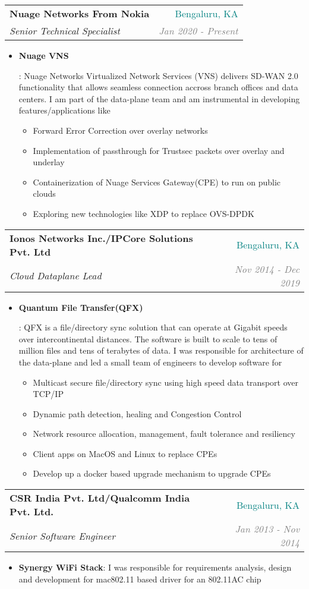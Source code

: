 \documentclass[letterpaper,11pt]{article}
\makeatletter
\newcommand{\resumeItem}[2]{
  \item\small{
    \textbf{#1}{: #2 \vspace{-2pt}}
  }
}
\newcommand{\resumeSubheading}[4]{
  \vspace{-1pt}\item
    \begin{tabular*}{0.97\textwidth}[t]{l@{\extracolsep{\fill}}r}
      \textbf{#1} & #2 \\
      \textit{\small#3} & \textit{\small #4} \\
    \end{tabular*}\vspace{-5pt}
}
\newcommand{\resumeItemListStart}{\begin{itemize}}
\newcommand{\resumeItemListEnd}{\end{itemize}\vspace{-5pt}}
\makeatother
\begin{document}
       \resumeSubheading
      {Nuage Networks From Nokia}{\textcolor{teal}{Bengaluru, KA}}
      {Senior Technical Specialist}{\textcolor{GRAY}{Jan 2020 - Present}}
      \resumeItemListStart
        \resumeItem{Nuage VNS}
          {
           Nuage Networks Virtualized Network Services (VNS) delivers SD-WAN 2.0 functionality that allows seamless connection accross branch offices and data centers. I am part of the data-plane team and am instrumental in developing features/applications like
           \begin{itemize}
           \item {Forward Error Correction over overlay networks}
           \item {Implementation of passthrough for Trustsec packets over overlay and underlay}
           \item {Containerization of Nuage Services Gateway(CPE) to run on public clouds}
           \item {Exploring new technologies like XDP to replace OVS-DPDK}
           \end{itemize}}
      \resumeItemListEnd
    \resumeSubheading
      {Ionos Networks Inc./IPCore Solutions Pvt. Ltd}{\textcolor{teal}{Bengaluru, KA}}
      {Cloud Dataplane Lead}{\textcolor{GRAY}{Nov 2014 - Dec 2019}}
      \resumeItemListStart
        \resumeItem{Quantum File Transfer(QFX)}
          {
           QFX is a file/directory sync solution that can operate at Gigabit speeds over intercontinental distances. The software is built to scale to tens of  million files and tens of  terabytes of data. I was responsible for architecture of the data-plane and led a small team of engineers to develop software for
           
           \begin{itemize}
           \item {Multicast secure file/directory sync using high speed data transport over TCP/IP}
           \item {Dynamic path detection, healing and Congestion Control}
           \item {Network resource allocation, management, fault tolerance and resiliency}
           \item {Client apps on MacOS and Linux to replace CPEs}
           \item {Develop up a docker based upgrade mechanism to upgrade CPEs}
           \end{itemize}}
      \resumeItemListEnd
	  
    \resumeSubheading
      {CSR India Pvt. Ltd/Qualcomm India Pvt. Ltd.}{\textcolor{teal}{Bengaluru, KA}}
      {Senior Software Engineer}{\textcolor{GRAY}{Jan 2013 - Nov 2014}}
      \resumeItemListStart
        \resumeItem{Synergy WiFi Stack}
        {I was responsible for requirements analysis, design and development for mac802.11 based driver for an 802.11AC chip}
      \resumeItemListEnd
\end{document}

